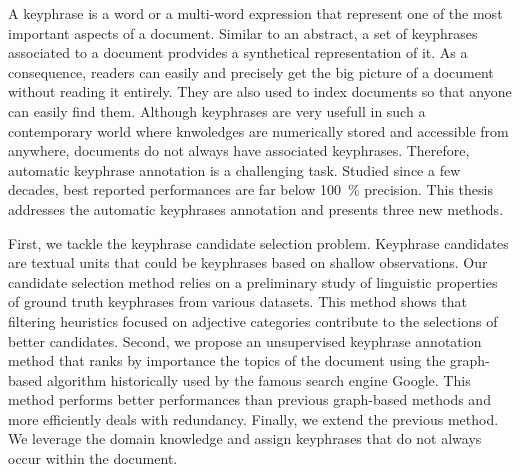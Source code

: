 A keyphrase is a word or a multi-word expression that represent one of the most
important aspects of a document. Similar to an abstract, a set of keyphrases
associated to a document prodvides a synthetical representation of it. As a
consequence, readers can easily and precisely get the big picture of a document
without reading it entirely. They are also used to index documents so that
anyone can easily find them. Although keyphrases are very usefull in such a
contemporary world where knwoledges are numerically stored and accessible from
anywhere, documents do not always have associated keyphrases. Therefore,
automatic keyphrase annotation is a challenging task. Studied since a few
decades, best reported performances are far below 100~\% precision. This thesis
addresses the automatic keyphrases annotation and presents three new methods.

First, we tackle the keyphrase candidate selection problem. Keyphrase candidates
are textual units that could be keyphrases based on shallow observations. Our
candidate selection method relies on a preliminary study of linguistic
properties of ground truth keyphrases from various datasets. This method shows
that filtering heuristics focused on adjective categories contribute to the
selections of better candidates. Second, we propose an unsupervised keyphrase
annotation method that ranks by importance the topics of the document using the
graph-based algorithm historically used by the famous search engine Google. This
method performs better performances than previous graph-based methods and more
efficiently deals with redundancy. Finally, we extend the previous method. We
leverage the domain knowledge and assign keyphrases that do not always occur
within the document.

